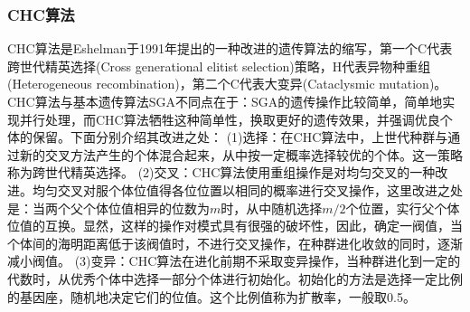         \subsubsection{CHC算法}
            \par
            CHC算法是Eshelman于1991年提出的一种改进的遗传算法的缩写，第一个C代表跨世代精英选择(Cross generational elitist selection)策略，H代表异物种重组(Heterogeneous recombination)，第二个C代表大变异(Cataclysmic mutation)。CHC算法与基本遗传算法SGA不同点在于：SGA的遗传操作比较简单，简单地实现并行处理，而CHC算法牺牲这种简单性，换取更好的遗传效果，并强调优良个体的保留。下面分别介绍其改进之处：
            (1)选择：在CHC算法中，上世代种群与通过新的交叉方法产生的个体混合起来，从中按一定概率选择较优的个体。这一策略称为跨世代精英选择。
            (2)交叉：CHC算法使用重组操作是对均匀交叉的一种改进。均匀交叉对服个体位值得各位位置以相同的概率进行交叉操作，这里改进之处是：当两个父个体位值相异的位数为$m$时，从中随机选择$m/2$个位置，实行父个体位值的互换。显然，这样的操作对模式具有很强的破坏性，因此，确定一阀值，当个体间的海明距离低于该阀值时，不进行交叉操作，在种群进化收敛的同时，逐渐减小阀值。
            (3)变异：CHC算法在进化前期不采取变异操作，当种群进化到一定的代数时，从优秀个体中选择一部分个体进行初始化。初始化的方法是选择一定比例的基因座，随机地决定它们的位值。这个比例值称为扩散率，一般取0.5。
